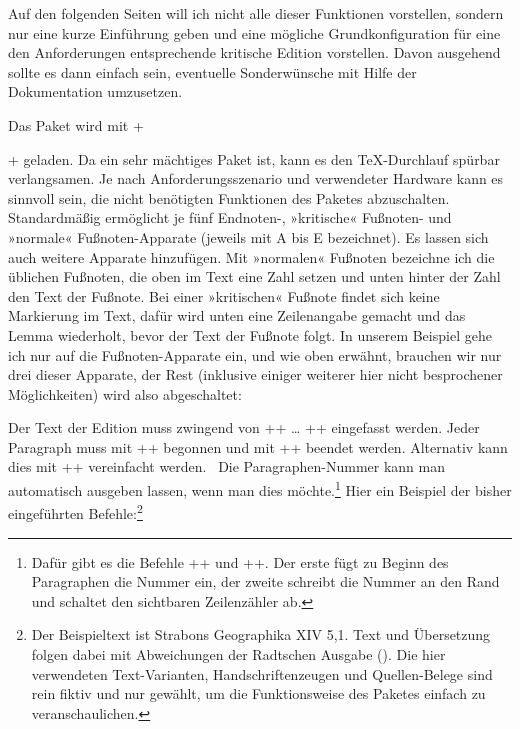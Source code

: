 Auf den folgenden Seiten will ich nicht alle dieser Funktionen vorstellen, sondern nur eine kurze Einführung geben und eine mögliche Grundkonfiguration für eine den Anforderungen entsprechende kritische Edition vorstellen. 
Davon ausgehend sollte es dann einfach sein, eventuelle Sonderwünsche mit Hilfe der Dokumentation umzusetzen.

Das Paket wird mit +\usepackage[<opt>]{reledmac}+ geladen. Da \reledmac ein sehr mächtiges Paket ist, kann es den \TeX-Durchlauf spürbar verlangsamen. Je nach Anforderungsszenario und verwendeter Hardware kann es sinnvoll sein, die nicht benötigten Funktionen des Paketes abzuschalten. Standardmäßig ermöglicht \reledmac je fünf Endnoten-, »kritische« Fußnoten- und »normale« Fußnoten-Apparate 
(jeweils mit A bis E bezeichnet). Es lassen sich auch weitere Apparate hinzufügen. Mit »normalen« Fußnoten bezeichne ich die üblichen Fußnoten, die oben im Text eine Zahl setzen 
und unten hinter der Zahl den Text der Fußnote. Bei einer »kritischen« Fußnote findet sich keine Markierung im Text, dafür wird 
unten eine Zeilenangabe gemacht und das Lemma wiederholt, bevor der Text der Fußnote folgt. In unserem Beispiel gehe ich nur auf die Fußnoten-Apparate ein, und wie oben erwähnt, brauchen wir nur drei dieser Apparate, der Rest 
(inklusive einiger weiterer hier nicht besprochener Möglichkeiten) wird also abgeschaltet:

\begin{lfgwcode}{}
\usepackage[%
  series={A,B,C},%
  noend,         %
  noeledsec,     %
  noledgroup     %
]{reledmac}
\end{lfgwcode}

Der Text der Edition muss zwingend von +\beginnumbering+ \dots{} +\endnumbering+ 
eingefasst werden. Jeder Paragraph muss mit +\pstart+ begonnen und mit +\pend+ beendet 
werden. Alternativ kann dies mit +\autopar+ vereinfacht werden.~\cite[17]{reledmac-benutzung} 
Die Paragraphen-Nummer kann man automatisch ausgeben lassen, wenn man dies 
möchte.\footnote{Dafür gibt es die Befehle +\numberpstarttrue+ und +\sidepstartnumtrue+. 
  Der erste fügt zu Beginn des Paragraphen die Nummer ein, der zweite schreibt die Nummer an 
den Rand und schaltet den sichtbaren Zeilenzähler ab.} 
Hier ein Beispiel der bisher eingeführten Befehle:\footnote{Der Beispieltext ist Strabons Geographika XIV 5,1. 
Text und Übersetzung folgen dabei mit Abweichungen der Radtschen Ausgabe (\cite[96\psq]{radt:strabon4}). 
Die hier verwendeten Text-Varianten, Handschriftenzeugen und Quellen-Belege sind rein 
fiktiv und nur gewählt, um die Funktionsweise des Paketes \reledmac einfach zu veranschaulichen.}

